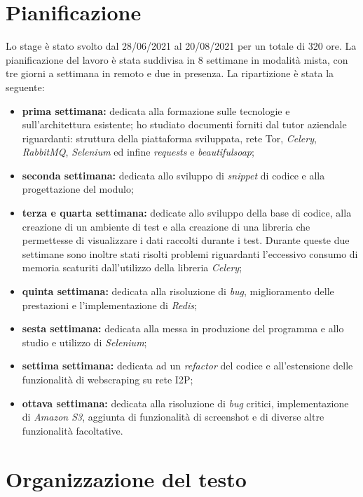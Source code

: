 \section{Pianificazione}
Lo stage è stato svolto dal 28/06/2021 al 20/08/2021 per un totale di 320 ore. La pianificazione del lavoro è stata suddivisa in 8 settimane in modalità mista, con tre giorni a settimana in remoto e due in presenza. La ripartizione è stata la seguente:
\begin{itemize}
	\item \textbf{prima settimana:} dedicata alla formazione sulle tecnologie e sull’architettura esistente; ho studiato documenti forniti dal tutor aziendale riguardanti: struttura della piattaforma sviluppata, rete \gls{Tor}, \emph{Celery}, \emph{RabbitMQ}, \emph{Selenium} ed infine \emph{requests} e \emph{beautifulsoap};
	\item \textbf{seconda settimana:} dedicata allo sviluppo di \emph{snippet} di codice e alla progettazione del modulo;
	\item \textbf{terza e quarta settimana:} dedicate allo sviluppo della base di codice, alla creazione di un ambiente di test e alla creazione di una libreria che permettesse di visualizzare i dati raccolti durante i test. Durante queste due settimane sono inoltre stati risolti problemi riguardanti l’eccessivo consumo di memoria scaturiti dall’utilizzo della libreria \emph{Celery};
	\item \textbf{quinta settimana:} dedicata alla risoluzione di \emph{bug}, miglioramento delle prestazioni e l’implementazione di \emph{Redis};
	\item \textbf{sesta settimana:} dedicata alla messa in produzione del programma e allo studio e utilizzo di \emph{Selenium};
	\item \textbf{settima settimana:} dedicata ad un \emph{refactor} del codice e all’estensione delle funzionalità di webscraping su rete \gls{I2P};
	\item \textbf{ottava settimana:} dedicata alla risoluzione di \emph{bug} critici, implementazione di \emph{Amazon S3}, aggiunta di funzionalità di screenshot e di diverse altre funzionalità facoltative.
\end{itemize}
\newpage{}
\section{Organizzazione del testo}

